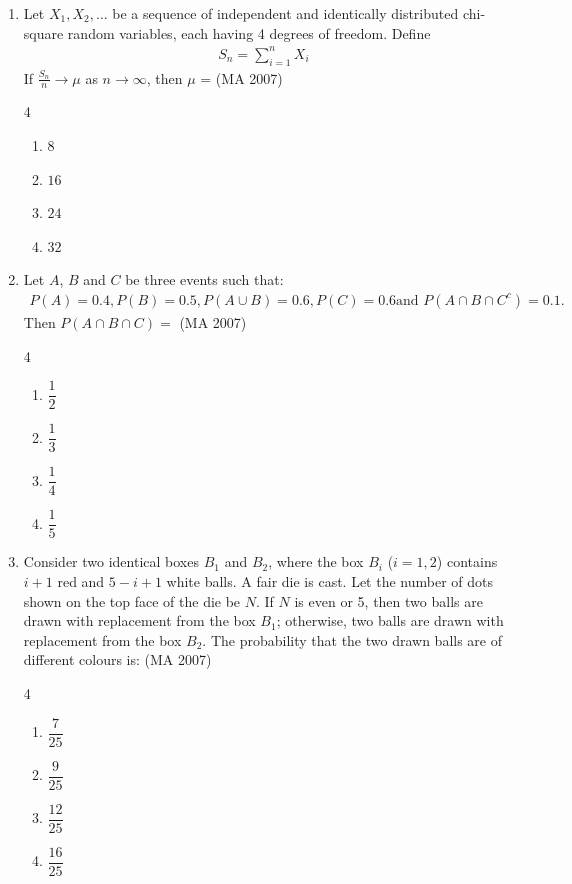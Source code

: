 \begin{enumerate}[label=\thesubsection.\arabic*,ref=\thesubsection.\theenumi]
\item Let $X_1, X_2, \dots$ be a sequence of independent and identically distributed chi-square random variables, each having 4 degrees of freedom. Define
\begin{align*}
S_n = \sum_{i=1}^n X_i
\end{align*}
If $\frac{S_n}{n} \to \mu$ as $n \to \infty$, then $\mu$ =
\hfill (MA 2007)
\begin{multicols}{4}
\begin{enumerate}
    \item $8$
    \item $16$
    \item $24$
    \item $32$
\end{enumerate}
\end{multicols}
 
\item Let $A$, $B$ and $C$ be three events such that:
    \begin{align*}
    P(A) = 0.4,P(B) = 0.5,P(A \cup B) = 0.6,P(C) = 0.6\text{and } P(A \cap B \cap C^c) = 0.1.
    \end{align*}
    Then $P(A \cap B \cap C) =$
    \hfill (MA 2007)
\begin{multicols}{4}
\begin{enumerate}
    \item $\dfrac{1}{2}$
    \item  $\dfrac{1}{3}$
    \item $\dfrac{1}{4}$
    \item $\dfrac{1}{5}$  
\end{enumerate}
\end{multicols}
        

\item Consider two identical boxes $B_1$ and $B_2$, where the box $B_i$ ($i=1,2$) contains $i+1$ red and $5 - i + 1$ white balls. A fair die is cast. Let the number of dots shown on the top face of the die be $N$. If $N$ is even or 5, then two balls are drawn with replacement from the box $B_1$; otherwise, two balls are drawn with replacement from the box $B_2$. The probability that the two drawn balls are of different colours is: \hfill (MA 2007)
\begin{multicols}{4}
\begin{enumerate}
    \item $\dfrac{7}{25}$
    \item  $\dfrac{9}{25}$
    \item $\dfrac{12}{25}$ 
    \item  $\dfrac{16}{25}$    
\end{enumerate}
\end{multicols}
        



\end{enumerate}
